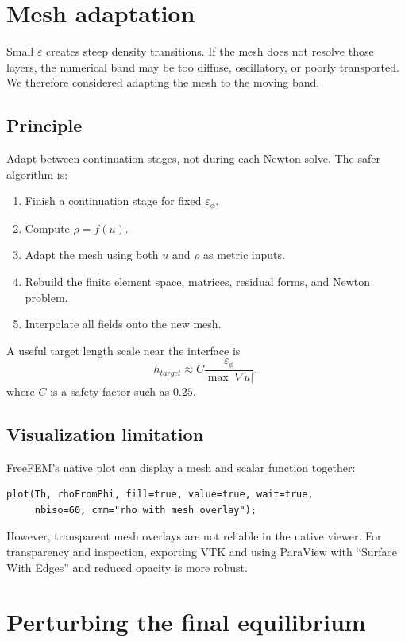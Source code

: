 \documentclass[11pt,a4paper]{article}
\newcommand{\eps}{\varepsilon}
\begin{document}
\section{Mesh adaptation}

Small $\eps$ creates steep density transitions. If the mesh does not resolve those layers, the numerical band may be too diffuse, oscillatory, or poorly transported. We therefore considered adapting the mesh to the moving band.

\subsection{Principle}

Adapt between continuation stages, not during each Newton solve. The safer algorithm is:
\begin{enumerate}[leftmargin=2em]
  \item Finish a continuation stage for fixed $\eps_\phi$.
  \item Compute $\rho=f(u)$.
  \item Adapt the mesh using both $u$ and $\rho$ as metric inputs.
  \item Rebuild the finite element space, matrices, residual forms, and Newton problem.
  \item Interpolate all fields onto the new mesh.
\end{enumerate}

A useful target length scale near the interface is
\begin{equation}
  h_{target}\approx C\frac{\eps_\phi}{\max|\nabla u|},
\end{equation}
where $C$ is a safety factor such as $0.25$.

\subsection{Visualization limitation}

FreeFEM's native plot can display a mesh and scalar function together:
\begin{lstlisting}[style=ff]
plot(Th, rhoFromPhi, fill=true, value=true, wait=true,
     nbiso=60, cmm="rho with mesh overlay");
\end{lstlisting}
However, transparent mesh overlays are not reliable in the native viewer. For transparency and inspection, exporting VTK and using ParaView with ``Surface With Edges'' and reduced opacity is more robust.

\section{Perturbing the final equilibrium}
\end{document}
